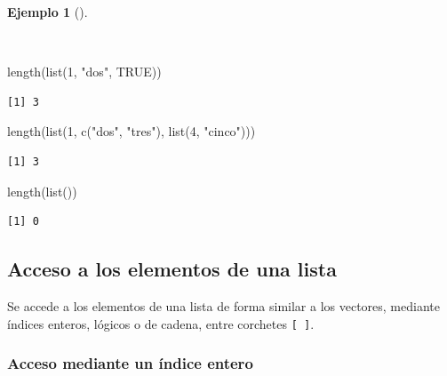 \documentclass[
  a4paper,
]{scrreport}
\newenvironment{Shaded}{\begin{snugshade}}{\end{snugshade}}
\newcommand{\ConstantTok}[1]{\textcolor[rgb]{0.56,0.35,0.01}{#1}}
\newcommand{\DecValTok}[1]{\textcolor[rgb]{0.68,0.00,0.00}{#1}}
\newcommand{\FunctionTok}[1]{\textcolor[rgb]{0.28,0.35,0.67}{#1}}
\newcommand{\NormalTok}[1]{\textcolor[rgb]{0.00,0.23,0.31}{#1}}
\newcommand{\StringTok}[1]{\textcolor[rgb]{0.13,0.47,0.30}{#1}}
\theoremstyle{definition}
\theoremstyle{definition}
\newtheorem{example}{Ejemplo}[chapter]
\theoremstyle{remark}
\begin{document}
\begin{example}[]\protect\hypertarget{exm-tamaño-lista}{}\label{exm-tamaño-lista}

~

\begin{Shaded}
\begin{Highlighting}[]
\FunctionTok{length}\NormalTok{(}\FunctionTok{list}\NormalTok{(}\DecValTok{1}\NormalTok{, }\StringTok{"dos"}\NormalTok{, }\ConstantTok{TRUE}\NormalTok{))}
\end{Highlighting}
\end{Shaded}

\begin{verbatim}
[1] 3
\end{verbatim}

\begin{Shaded}
\begin{Highlighting}[]
\FunctionTok{length}\NormalTok{(}\FunctionTok{list}\NormalTok{(}\DecValTok{1}\NormalTok{, }\FunctionTok{c}\NormalTok{(}\StringTok{"dos"}\NormalTok{, }\StringTok{"tres"}\NormalTok{), }\FunctionTok{list}\NormalTok{(}\DecValTok{4}\NormalTok{, }\StringTok{"cinco"}\NormalTok{)))}
\end{Highlighting}
\end{Shaded}

\begin{verbatim}
[1] 3
\end{verbatim}

\begin{Shaded}
\begin{Highlighting}[]
\FunctionTok{length}\NormalTok{(}\FunctionTok{list}\NormalTok{())}
\end{Highlighting}
\end{Shaded}

\begin{verbatim}
[1] 0
\end{verbatim}

\end{example}

\subsection{Acceso a los elementos de una
lista}\label{acceso-a-los-elementos-de-una-lista}

Se accede a los elementos de una lista de forma similar a los vectores,
mediante índices enteros, lógicos o de cadena, entre corchetes
\texttt{{[}\ {]}}.

\subsubsection{Acceso mediante un índice
entero}\label{acceso-mediante-un-uxedndice-entero-1}
\end{document}
